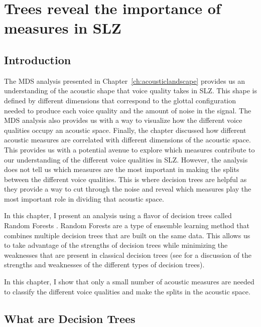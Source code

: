 \chapter{Trees reveal the importance of measures in SLZ} \label{ch:revealing_trees}

\section{Introduction} \label{sec:bagging_intro}

The MDS analysis presented in Chapter~\ref{ch:acousticlandscape} provides us an understanding of the acoustic shape that voice quality takes in SLZ. This shape is defined by different dimensions that correspond to the glottal configuration needed to produce each voice quality and the amount of noise in the signal. The MDS analysis also provides us with a way to visualize how the different voice qualities occupy an acoustic space. Finally, the chapter discussed how different acoustic measures are correlated with different dimensions of the acoustic space. This provides us with a potential avenue to explore which measures contribute to our understanding of the different voice qualities in SLZ.
However, the analysis does not tell us which measures are the most important in making the splits between the different voice qualities. This is where decision trees are helpful as they provide a way to cut through the noise and reveal which measures play the most important role in dividing that acoustic space. 

In this chapter, I present an analysis using a flavor of decision trees called Random Forests \citep{breimanClassificationRegressionTrees1986,breimanRandomForests2001}. Random Forests are a type of ensemble learning method that combines multiple decision trees that are built on the same data. This allows us to take advantage of the strengths of decision trees while minimizing the weaknesses that are present in classical decision trees (see \cite{hastieElementsStatisticalLearning2009,boehmkeHandsOnMachineLearning2019,jamesIntroductionStatisticalLearning2021} for a discussion of the strengths and weaknesses of the different types of decision trees).

In this chapter, I show that only a small number of acoustic measures are needed to classify the different voice qualities and make the splits in the acoustic space. 

\section{What are Decision Trees} \label{sec:what_are_dt}

